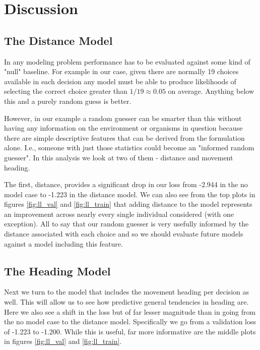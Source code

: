 \documentclass[11pt]{article}
\begin{document}
\section*{Discussion}

\subsection*{The Distance Model}


In any modeling problem performance has to be evaluated against some kind of "null" baseline. For example in our case, given there are normally 19 choices available in each decision any model must be able to produce likelihoods of selecting the correct choice greater than $1/19\approx 0.05$ on average. Anything below this and a purely random guess is better. 

However, in our example a random guesser can be smarter than this without having any information on the environment or organisms in question because there are simple descriptive features that can be derived from the formulation alone. I.e., someone with just those statistics could become an "informed random guesser". In this analysis we look at two of them - distance and movement heading. 

The first, distance, provides a significant drop in our loss from -2.944 in the no model case to -1.223 in the distance model. We can also see from the top plots in figures \ref{fig:ll_val} and \ref{fig:ll_train} that adding distance to the model represents an improvement across nearly every single individual considered (with one exception). All to say that our random guesser is very usefully informed by the distance associated with each choice and so we should evaluate future models against a model including this feature. 

\subsection*{The Heading Model}

Next we turn to the model that includes the movement heading per decision as well. This will allow us to see how predictive general tendencies in heading are. Here we also see a shift in the loss but of far lesser magnitude than in going from the no model case to the distance model. Specifically we go from a validation loss of -1.223 to -1.200. While this is useful, far more informative are the middle plots in figures \ref{fig:ll_val} and \ref{fig:ll_train}. 
\end{document}
